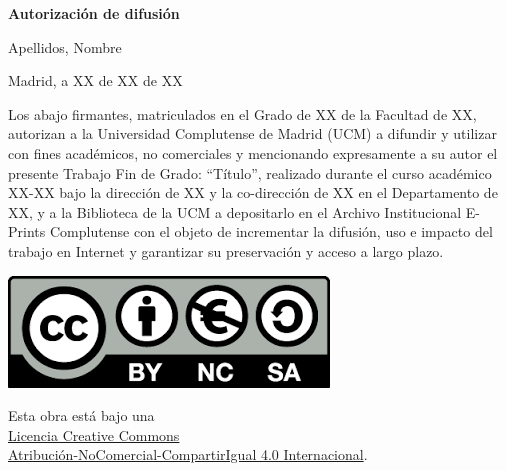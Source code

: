 % 
\newpage
\thispagestyle{empty}
\mbox{}
\newpage

\thispagestyle{empty}

\begin{center}

{\bf \Huge Autorización de difusión}

\vspace{1cm}

% 
   \large Apellidos, Nombre\\

   \vspace{0.5cm}

% 
   Madrid, a XX de XX de XX\\

   \vspace{0.5cm} \end{center}

Los abajo firmantes, matriculados en el Grado de XX de la
Facultad de XX, autorizan a la Universidad Complutense de Madrid (UCM) a
difundir y utilizar con fines académicos, no comerciales y mencionando
expresamente a su autor el presente Trabajo Fin de Grado: “Título”, realizado
durante el curso académico XX-XX bajo la dirección de XX y la co-dirección de XX en el Departamento de XX, y a la
Biblioteca de la UCM a depositarlo en el Archivo Institucional E-Prints
Complutense con el objeto de incrementar la difusión, uso e impacto del trabajo
en Internet y garantizar su preservación y acceso a largo plazo.

{
\begin{center}
\vfill
\includegraphics{figures/cc-by-nc-sa.png}
\tiny

Esta obra está bajo una\\
\href{http://creativecommons.org/licenses/by-nc-sa/4.0/}{Licencia Creative Commons\\Atribución-NoComercial-CompartirIgual 4.0 Internacional}.
\end{center}
}